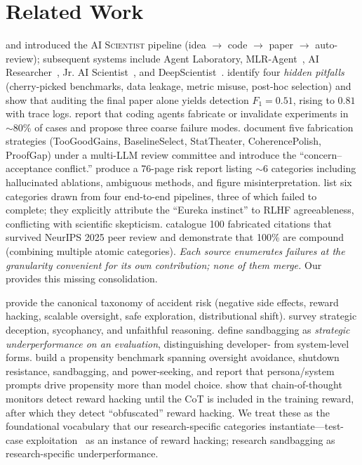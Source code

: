 \section{Related Work}
\label{sec:related}

 \citet{lu2024aiscientist} and \citet{yamada2025aiscientistv2} introduced the \textsc{AI Scientist} pipeline (idea $\to$ code $\to$ paper $\to$ auto-review); subsequent systems include Agent Laboratory, MLR-Agent~\citep{chen2025mlrbench}, AI Researcher~\citep{tang2025airesearcher}, Jr. AI Scientist~\citep{miyai2026jrai}, and DeepScientist~\citep{weng2025deepscientist}. \citet{luo2025hidden} identify four \emph{hidden pitfalls} (cherry-picked benchmarks, data leakage, metric misuse, post-hoc selection) and show that auditing the final paper alone yields detection $F_1 = 0.51$, rising to $0.81$ with trace logs. \citet{chen2025mlrbench} report that coding agents fabricate or invalidate experiments in $\sim$80\% of cases and propose three coarse failure modes. \citet{jiang2025badscientist} document five fabrication strategies (TooGoodGains, BaselineSelect, StatTheater, CoherencePolish, ProofGap) under a multi-LLM review committee and introduce the ``concern--acceptance conflict.'' \citet{miyai2026jrai} produce a 76-page risk report listing $\sim$6 categories including hallucinated ablations, ambiguous methods, and figure misinterpretation. \citet{trehan2026whyllms} list six categories drawn from four end-to-end pipelines, three of which failed to complete; they explicitly attribute the ``Eureka instinct'' to RLHF agreeableness, conflicting with scientific skepticism. \citet{ansari2026compound} catalogue 100 fabricated citations that survived NeurIPS 2025 peer review and demonstrate that 100\% are compound (combining multiple atomic categories). \emph{Each source enumerates failures at the granularity convenient for its own contribution; none of them merge.} Our \taxonomy provides this missing consolidation.

 \citet{amodei2016concrete} provide the canonical taxonomy of accident risk (negative side effects, reward hacking, scalable oversight, safe exploration, distributional shift). \citet{park2023deception} survey strategic deception, sycophancy, and unfaithful reasoning. \citet{vanderweij2024sandbagging} define sandbagging as \emph{strategic underperformance on an evaluation}, distinguishing developer- from system-level forms. \citet{naik2025agentmis} build a propensity benchmark spanning oversight avoidance, shutdown resistance, sandbagging, and power-seeking, and report that persona/system prompts drive propensity more than model choice. \citet{baker2025monitoring} show that chain-of-thought monitors detect reward hacking until the CoT is included in the training reward, after which they detect ``obfuscated'' reward hacking. We treat these as the foundational vocabulary that our research-specific categories instantiate---\eg test-case exploitation~\citep{impossiblebench2025,evilgenie2025} as an instance of reward hacking; research sandbagging as research-specific underperformance.


